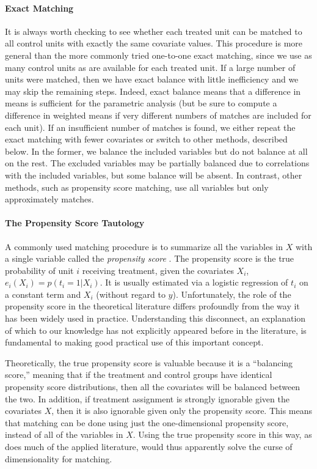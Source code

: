 \documentclass[11pt,titlepage]{article}
\begin{document}
\paragraph{Exact Matching}  
It is always worth checking to see whether each treated unit can be
matched to all control units with exactly the same covariate values.
This procedure is more general than the more commonly tried one-to-one
exact matching, since we use as many control units as are available
for each treated unit.  If a large number of units were matched, then
we have exact balance with little inefficiency and we may skip the
remaining steps.  Indeed, exact balance means that a difference in
means is sufficient for the parametric analysis (but be sure to
compute a difference in weighted means if very different numbers of
matches are included for each unit).  If an insufficient number of
matches is found, we either repeat the exact matching with fewer
covariates or switch to other methods, described below.  In the
former, we balance the included variables but do not balance at all on
the rest.  The excluded variables may be partially balanced due to
correlations with the included variables, but some balance will be
absent.  In contrast, other methods, such as propensity score
matching, use all variables but only approximately matches.

\paragraph{The Propensity Score Tautology}
A commonly used matching procedure is to summarize all the variables
in $X$ with a single variable called the \emph{propensity score}
\citep{RosRub83}.  The propensity score is the true probability of
unit $i$ receiving treatment, given the covariates $X_i$, $e_i(X_i) =
p(t_i=1 | X_i)$.  It is usually estimated via a logistic regression of
$t_i$ on a constant term and $X_i$ (without regard to $y$).
Unfortunately, the role of the propensity score in the theoretical
literature differs profoundly from the way it has been widely used in
practice.  Understanding this disconnect, an explanation of which to
our knowledge has not explicitly appeared before in the literature, is
fundamental to making good practical use of this important concept.

Theoretically, the true propensity score is valuable because it is a
``balancing score,'' meaning that if the treatment and control groups
have identical propensity score distributions, then all the covariates
will be balanced between the two.  In addition, if treatment
assignment is strongly ignorable given the covariates $X$, then it is
also ignorable given only the propensity score.  This means that
matching can be done using just the one-dimensional propensity score,
instead of all of the variables in $X$.  Using the true propensity
score in this way, as does much of the applied literature, would thus
apparently solve the curse of dimensionality for matching.
\end{document}
